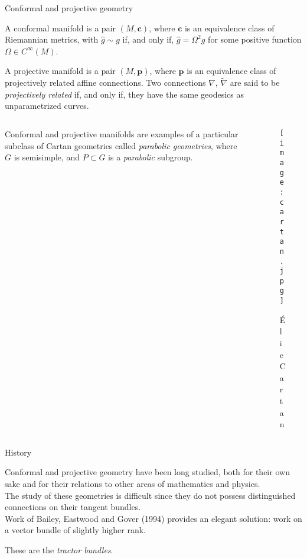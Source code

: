 \documentclass{beamer}
\renewcommand{\hat}{\widehat}
\begin{document}
\begin{frame}{Conformal and projective geometry}

  \begin{definition}
    A conformal manifold is a pair \( (M, \bm{c}) \), where \( \bm{c} \) is an equivalence class of Riemannian metrics, with \( \hat{g} \sim g \) if, and only if, \( \hat{g} = \Omega^2 g \) for some positive function \( \Omega \in C^\infty (M) \).
  \end{definition}

  \begin{definition}
    A projective manifold is a pair \( (M, \bm{p}) \), where \( \bm{p} \) is an
    equivalence class of projectively related affine connections. Two connections \( \nabla \), \(
    \tilde{\nabla} \) are said to be \emph{projectively related} if, and only if, they have the same geodesics
    as unparametrized curves.
  \end{definition}

  \vspace{-1em}
  \begin{columns}
    \begin{column}{0.6\textwidth}
      \pause
      Conformal and projective manifolds are examples of 
      a particular subclass of Cartan geometries called \emph{parabolic geometries}, where \( G \) is semisimple, and \( P \subset G \) is a \emph{parabolic} subgroup.
    \end{column}
      \begin{column}{0.4\textwidth}
        \hspace{1.5em}
        \begin{figure}
          \texttt{[image: cartan.jpg]}
          \caption*{\'{E}lie Cartan}
        \end{figure}
      \end{column}
  \end{columns}

\end{frame}

\begin{frame}{History}

Conformal and projective geometry have been long studied, both for their own
sake and for their relations to other areas of mathematics and physics.
\vspace{1em}\\
\pause
The study of these geometries is difficult since they do not possess distinguished connections on their tangent bundles.
\vspace{1em}\\
\pause
Work of Bailey, Eastwood and Gover (1994) provides an elegant solution: work on a vector bundle of slightly higher rank. 

These are the \emph{tractor bundles}.

\end{frame}
\end{document}
